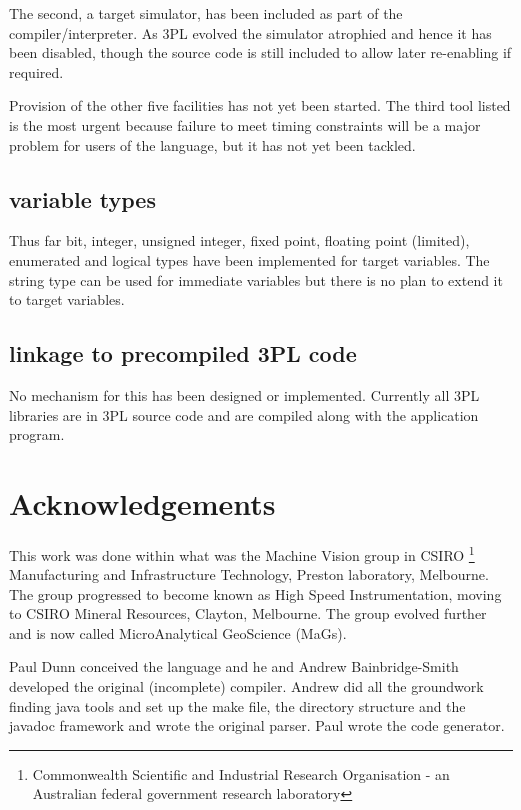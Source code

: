             The second, a target simulator, has been included as part of the
            compiler/interpreter. As 3PL evolved the simulator atrophied
            and hence it has been disabled, though the source code is still
            included to allow later re-enabling if required.

            Provision of the other five facilities has not yet been started. The
            third tool listed is the most urgent because failure to meet timing
            constraints will be a major problem for users of the language, but
            it has not yet been tackled.

        \subsection{variable types}

            Thus far bit, integer, unsigned integer, fixed point, floating point
            (limited), enumerated and logical types have been implemented for
            target variables. The string type can be used for immediate
            variables but there is no plan to extend it to target variables.

        \subsection{linkage to precompiled 3PL code}

            No mechanism for this has been designed or implemented.
            Currently all 3PL libraries are in 3PL source code and are
            compiled along with the application program.



    \section{Acknowledgements}

        This work was done within what was the Machine Vision group in CSIRO
        \footnote{Commonwealth Scientific and Industrial Research Organisation -
        an Australian federal government research laboratory}
        Manufacturing and Infrastructure Technology, Preston laboratory,
        Melbourne. The group progressed to become known as High Speed
        Instrumentation, moving to CSIRO Mineral Resources, Clayton, Melbourne.
        The group evolved further and is now called MicroAnalytical
        GeoScience (MaGs).

        Paul Dunn conceived the language and he and Andrew Bainbridge-Smith
        developed the original (incomplete) compiler. Andrew did all the
        groundwork finding java tools and set up the make file, the directory
        structure and the javadoc framework and wrote the original parser. Paul
        wrote the code generator.

